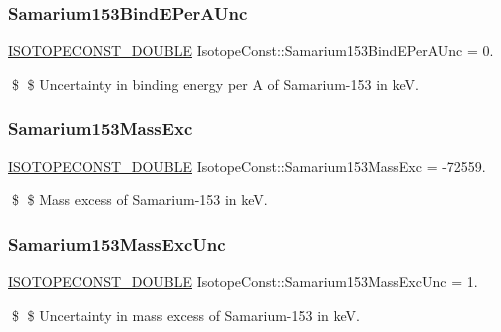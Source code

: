 \subsubsection{\texorpdfstring{Samarium153\+Bind\+E\+Per\+A\+Unc}{Samarium153BindEPerAUnc}}
{\footnotesize\ttfamily \mbox{\hyperlink{group___isotope_const-_macros_ga8f45a7272ce02c0b4c65c44636ed719a}{I\+S\+O\+T\+O\+P\+E\+C\+O\+N\+S\+T\+\_\+\+D\+O\+U\+B\+LE}} Isotope\+Const\+::\+Samarium153\+Bind\+E\+Per\+A\+Unc = 0.}

\$ \$ Uncertainty in binding energy per A of Samarium-\/153 in keV. \mbox{\label{group___isotope_const-_samarium-_sm153_gaec618f2745f27c52ed8de9b36ecd3bb3}} 
\subsubsection{\texorpdfstring{Samarium153\+Mass\+Exc}{Samarium153MassExc}}
{\footnotesize\ttfamily \mbox{\hyperlink{group___isotope_const-_macros_ga8f45a7272ce02c0b4c65c44636ed719a}{I\+S\+O\+T\+O\+P\+E\+C\+O\+N\+S\+T\+\_\+\+D\+O\+U\+B\+LE}} Isotope\+Const\+::\+Samarium153\+Mass\+Exc = -\/72559.}

\$ \$ Mass excess of Samarium-\/153 in keV. \mbox{\label{group___isotope_const-_samarium-_sm153_gab2eac4c5e26a95d4fd5ed06274e1378e}} 
\subsubsection{\texorpdfstring{Samarium153\+Mass\+Exc\+Unc}{Samarium153MassExcUnc}}
{\footnotesize\ttfamily \mbox{\hyperlink{group___isotope_const-_macros_ga8f45a7272ce02c0b4c65c44636ed719a}{I\+S\+O\+T\+O\+P\+E\+C\+O\+N\+S\+T\+\_\+\+D\+O\+U\+B\+LE}} Isotope\+Const\+::\+Samarium153\+Mass\+Exc\+Unc = 1.}

\$ \$ Uncertainty in mass excess of Samarium-\/153 in keV. \mbox{\label{group___isotope_const-_samarium-_sm153_gab7aadc1bb15ced1d5abbdd7f42b5497d}} 
